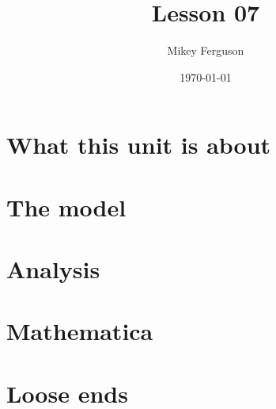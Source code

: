 \documentclass[11pt]{article}
\title{Lesson 07}
\author{Mikey Ferguson}
\date{\today}
\begin{document}
\maketitle
\tableofcontents
\bigskip

\section{What this unit is about}

\section{The model}

\section{Analysis}

\section{Mathematica}

\section{Loose ends}
\end{document}
